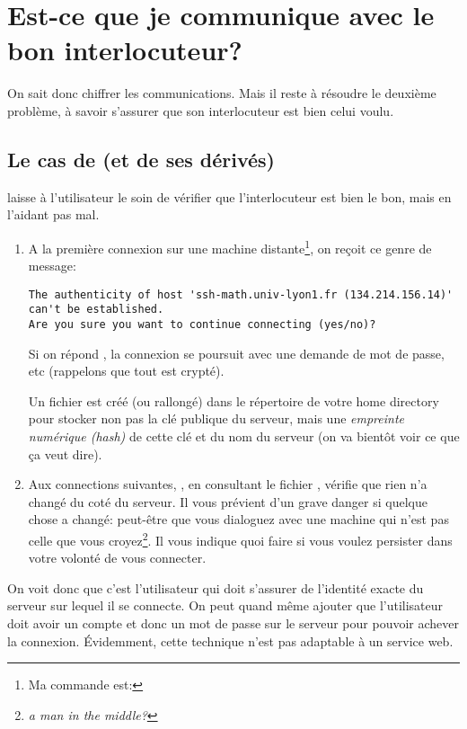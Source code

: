 \section{Est-ce que je communique avec le bon interlocuteur?}
On sait donc chiffrer les communications. Mais il reste à résoudre le
deuxième problème, à savoir s'assurer que son interlocuteur est bien
celui voulu.
\subsection{Le cas de  (et de ses dérivés)}
 laisse à l'utilisateur le soin de vérifier que
l'interlocuteur est bien le bon, mais en l'aidant pas mal.

\begin{enumerate}
\item A la première connexion sur une machine distante\footnote{Ma commande
  est: }, on reçoit ce
  genre de message:

\begin{verbatim}
The authenticity of host 'ssh-math.univ-lyon1.fr (134.214.156.14)'
can't be established.
Are you sure you want to continue connecting (yes/no)? 
\end{verbatim}

Si on répond , la connexion se poursuit avec une demande de
mot de passe, etc (rappelons que tout est crypté).

Un fichier  est créé (ou rallongé) dans le
répertoire  de votre home directory
pour stocker non 
pas la clé publique du serveur, mais une \emph{empreinte numérique
  (hash)} de cette clé et du nom du serveur (on
va bientôt voir ce que ça veut dire).

\item Aux connections suivantes, , en consultant le fichier
  , vérifie que rien n'a changé du coté du serveur.
  Il vous prévient d'un grave danger si quelque chose a changé:
  peut-être que vous dialoguez avec une machine qui n'est pas celle
  que vous croyez\footnote{\emph{a man in the middle?}}. Il vous
  indique quoi faire si vous voulez persister 
  dans votre volonté de vous connecter.

\end{enumerate}

On voit donc que c'est l'utilisateur qui doit s'assurer de l'identité
exacte du serveur sur lequel il se connecte. On peut quand même
ajouter que l'utilisateur doit avoir un compte et donc un mot de passe
sur le serveur 
pour pouvoir achever la connexion. Évidemment, cette technique n'est
pas adaptable à un service  web.

